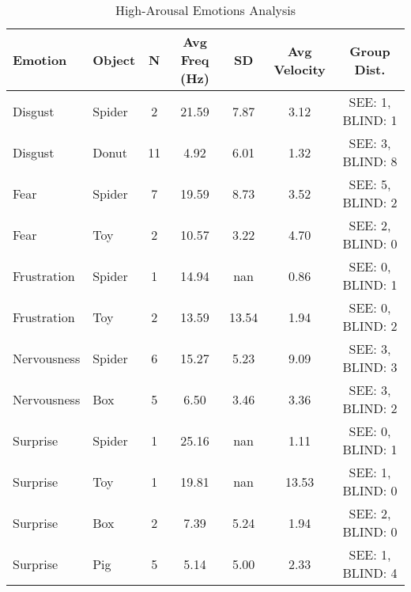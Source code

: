 \begin{table}[h]
\centering
\caption{High-Arousal Emotions Analysis}
\begin{tabular}{llccccc}
\hline
Emotion & Object & N & Avg Freq (Hz) & SD & Avg Velocity & Group Dist. \\
\hline
Disgust & Spider & 2 & 21.59 & 7.87 & 3.12 & SEE: 1, BLIND: 1 \\
Disgust & Donut & 11 & 4.92 & 6.01 & 1.32 & SEE: 3, BLIND: 8 \\
\hline
Fear & Spider & 7 & 19.59 & 8.73 & 3.52 & SEE: 5, BLIND: 2 \\
Fear & Toy & 2 & 10.57 & 3.22 & 4.70 & SEE: 2, BLIND: 0 \\
\hline
Frustration & Spider & 1 & 14.94 & nan & 0.86 & SEE: 0, BLIND: 1 \\
Frustration & Toy & 2 & 13.59 & 13.54 & 1.94 & SEE: 0, BLIND: 2 \\
\hline
Nervousness & Spider & 6 & 15.27 & 5.23 & 9.09 & SEE: 3, BLIND: 3 \\
Nervousness & Box & 5 & 6.50 & 3.46 & 3.36 & SEE: 3, BLIND: 2 \\
\hline
Surprise & Spider & 1 & 25.16 & nan & 1.11 & SEE: 0, BLIND: 1 \\
Surprise & Toy & 1 & 19.81 & nan & 13.53 & SEE: 1, BLIND: 0 \\
Surprise & Box & 2 & 7.39 & 5.24 & 1.94 & SEE: 2, BLIND: 0 \\
Surprise & Pig & 5 & 5.14 & 5.00 & 2.33 & SEE: 1, BLIND: 4 \\
\hline
\end{tabular}
\end{table}